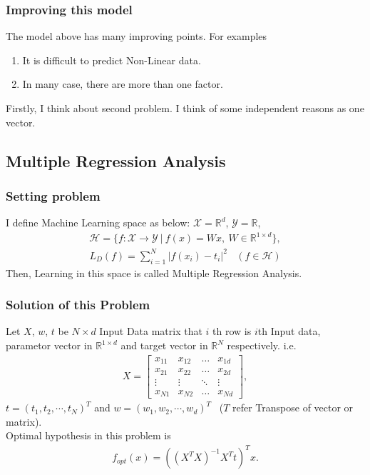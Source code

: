\documentclass[11pt, a4paper, english, dvipdfmx]{jsarticle}
\theoremstyle{definition}
\newcommand{\R}{\mathbb{R}}
\newcommand{\X}{\mathcal{X}}
\newcommand{\Y}{\mathcal{Y}}
\newcommand{\Hil}{\mathcal{H}}
\begin{document}
\subsubsection{Improving this model}
The model above has many improving points. For examples
\begin{enumerate}
    \item It is difficult to predict Non-Linear data.
    \item In many case, there are more than one factor.
\end{enumerate}
Firstly, I think about second problem. I think of some independent reasons  as one vector.
\subsection{Multiple Regression Analysis}
\subsubsection{Setting problem}
I define Machine Learning space as below: $\X = \R^{d}$, $\Y = \R$,
\begin{align*}
    \Hil = \{f:\X\to\Y~|~f(x) = Wx,~ W\in\R^{1\times d}\},
\end{align*}
\begin{align*}
    L_{D}(f) = \sum_{i = 1}^{N} |f(x_{i}) - t_{i}|^{2}~~~~(f\in\Hil)
\end{align*}
Then, Learning in this space is called Multiple Regression Analysis.

\subsubsection{Solution of this Problem}
Let $X$, $w$, $t$ be $N\times d$ Input Data matrix that $i$ th row is $i$th Input data, parametor vector in $\R^{1\times d}$ and target vector in $\R^{N}$ respectively. i.e.
\begin{align*}
    X =
    \left[ \begin{array}{cccc} {x_{11}} & {x_{12}} & {\dots} & {x_{1 d}} \\
   {x_{21}} & {x_{22}} & {\dots} & {x_{2 d}} \\
   {\vdots} & {\vdots} & {\ddots} &  {\vdots}\\
  {x_{N 1}} & {x_{N 2}} & {\dots} & {x_{N d}}\end{array}\right],
\end{align*}
$t = (t_{1}, t_{2}, \cdots, t_{N})^{T}$ and $w = (w_{1}, w_{2}, \cdots, w_{d})^{T}$~ ($T$ refer Transpose of vector or matrix).\\
Optimal hypothesis in this problem is
\begin{align*}
    f_{opt}(x) = ((X^{T}X)^{-1}X^{T}t)^{T}x.
\end{align*}
\end{document}

